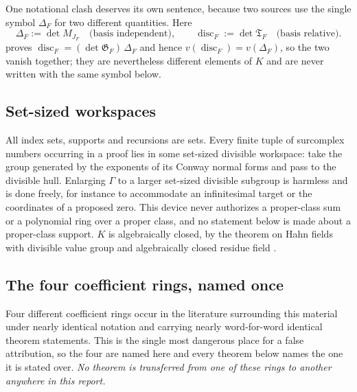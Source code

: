 \documentclass[11pt,letterpaper]{article}
\theoremstyle{definition}
\theoremstyle{remark}
\newcommand{\Gram}{\mathfrak G}
\newcommand{\TGram}{\mathfrak T}
\DeclareMathOperator{\disc}{disc}
\numberwithin{equation}{section}
\begin{document}
One notational clash deserves its own sentence, because two sources use the single symbol $\Delta_F$ for two different quantities. Here
\begin{equation}\label{finite:eq:twodiscriminants}
 \Delta_F:=\det M_{J_F}
 \quad\text{(basis independent)},
 \qquad
 \disc_F:=\det\TGram_F
 \quad\text{(basis relative)} .
\end{equation}
 proves $\disc_F=(\det\Gram_F)\,\Delta_F$ and hence $v(\disc_F)=v(\Delta_F)$, so the two vanish together; they are nevertheless different elements of $K$ and are never written with the same symbol below.

\subsection{Set-sized workspaces}
\label{finite:sec:workspace}

All index sets, supports and recursions are sets. Every finite tuple of surcomplex numbers occurring in a proof lies in some set-sized divisible workspace: take the group generated by the exponents of its Conway normal forms and pass to the divisible hull. Enlarging $\Gamma$ to a larger set-sized divisible subgroup is harmless and is done freely, for instance to accommodate an infinitesimal target or the coordinates of a proposed zero. This device never authorizes a proper-class sum or a polynomial ring over a proper class, and no statement below is made about a proper-class support. $K$ is algebraically closed, by the theorem on Hahn fields with divisible value group and algebraically closed residue field \cite[Corollary 4]{finite:Poonen}.

\subsection{The four coefficient rings, named once}
\label{finite:sec:rings}

Four different coefficient rings occur in the literature surrounding this material under nearly identical notation and carrying nearly word-for-word identical theorem statements. This is the single most dangerous place for a false attribution, so the four are named here and every theorem below names the one it is stated over. \emph{No theorem is transferred from one of these rings to another anywhere in this report.}
\end{document}
